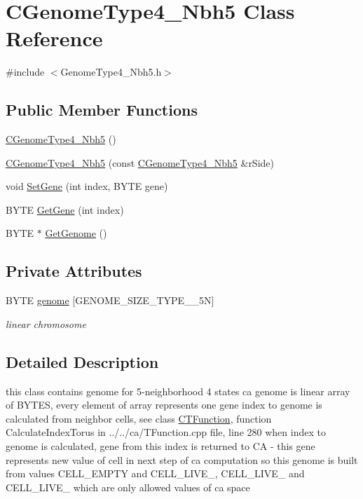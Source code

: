 \hypertarget{classCGenomeType4__Nbh5}{
\section{CGenomeType4\_\-Nbh5 Class Reference}
\label{classCGenomeType4__Nbh5}
}


{\ttfamily \#include $<$GenomeType4\_\-Nbh5.h$>$}\subsection*{Public Member Functions}
\begin{DoxyCompactItemize}
\item 
\hyperlink{classCGenomeType4__Nbh5_a96f7aa0a4c39d5ee4ae0004665f07703}{CGenomeType4\_\-Nbh5} ()
\item 
\hyperlink{classCGenomeType4__Nbh5_a57c8c7a3a1b974aac79301a47099706f}{CGenomeType4\_\-Nbh5} (const \hyperlink{classCGenomeType4__Nbh5}{CGenomeType4\_\-Nbh5} \&rSide)
\item 
void \hyperlink{classCGenomeType4__Nbh5_a70b89c7c7cc3322542ce3f5893de6e5b}{SetGene} (int index, BYTE gene)
\item 
BYTE \hyperlink{classCGenomeType4__Nbh5_adc99401e56d98f872bd63187f5f72dea}{GetGene} (int index)
\item 
BYTE $\ast$ \hyperlink{classCGenomeType4__Nbh5_a537e675ab4f3d5d9455c0aa458975674}{GetGenome} ()
\end{DoxyCompactItemize}
\subsection*{Private Attributes}
\begin{DoxyCompactItemize}
\item 
\hypertarget{classCGenomeType4__Nbh5_ae61d34a7379a5725e760188c440191db}{
BYTE \hyperlink{classCGenomeType4__Nbh5_ae61d34a7379a5725e760188c440191db}{genome} \mbox{[}GENOME\_\-SIZE\_\-TYPE\_\_\-5N\mbox{]}}
\label{classCGenomeType4__Nbh5_ae61d34a7379a5725e760188c440191db}

\begin{DoxyCompactList}\small\item\em linear chromosome \item\end{DoxyCompactList}\end{DoxyCompactItemize}


\subsection{Detailed Description}
this class contains genome for 5-\/neighborhood 4 states ca genome is linear array of BYTES, every element of array represents one gene index to genome is calculated from neighbor cells, see class \hyperlink{classCTFunction}{CTFunction}, function CalculateIndexTorus in ../../ca/TFunction.cpp file, line 280 when index to genome is calculated, gene from this index is returned to CA -\/ this gene represents new value of cell in next step of ca computation so this genome is built from values CELL\_\-EMPTY and CELL\_\-LIVE\_, CELL\_\-LIVE\_ and CELL\_\-LIVE\_ which are only allowed values of ca space 

